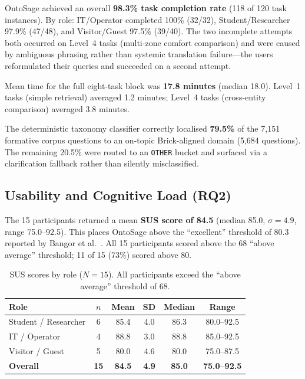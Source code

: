 \documentclass[acmsmall]{acmart}
\begin{document}
OntoSage achieved an overall \textbf{98.3\% task completion rate} (118 of 120 task instances). By role: IT/Operator completed 100\% (32/32), Student/Researcher 97.9\% (47/48), and Visitor/Guest 97.5\% (39/40). The two incomplete attempts both occurred on Level~4 tasks (multi-zone comfort comparison) and were caused by ambiguous phrasing rather than systemic translation failure---the users reformulated their queries and succeeded on a second attempt.

Mean time for the full eight-task block was \textbf{17.8 minutes} (median 18.0). Level~1 tasks (simple retrieval) averaged 1.2 minutes; Level~4 tasks (cross-entity comparison) averaged 3.8 minutes.

The deterministic taxonomy classifier correctly localised \textbf{79.5\%} of the 7{,}151 formative corpus questions to an on-topic Brick-aligned domain (5{,}684 questions). The remaining 20.5\% were routed to an \texttt{OTHER} bucket and surfaced via a clarification fallback rather than silently misclassified.

\subsection{Usability and Cognitive Load (RQ2)}
\label{sec:rq3-usability}

The 15 participants returned a mean \textbf{SUS score of 84.5} (median 85.0, $\sigma=4.9$, range 75.0--92.5). This places OntoSage above the ``excellent'' threshold of 80.3 reported by Bangor et al.\ \cite{Brooke1996}. All 15 participants scored above the 68 ``above average'' threshold; 11 of 15 (73\%) scored above 80.

\begin{table}[t]
\centering
\caption{SUS scores by role ($N=15$). All participants exceed the ``above average'' threshold of 68.}
\label{tab:sus-results}
\small
\begin{tabular}{@{}lccccc@{}}
\toprule
\textbf{Role} & \textbf{$n$} & \textbf{Mean} & \textbf{SD} & \textbf{Median} & \textbf{Range} \\
\midrule
Student / Researcher & 6  & 85.4 & 4.0 & 86.3 & 80.0--92.5 \\
IT / Operator        & 4  & 88.8 & 3.0 & 88.8 & 85.0--92.5 \\
Visitor / Guest      & 5  & 80.0 & 4.6 & 80.0 & 75.0--87.5 \\
\midrule
\textbf{Overall}     & \textbf{15} & \textbf{84.5} & \textbf{4.9} & \textbf{85.0} & \textbf{75.0--92.5} \\
\bottomrule
\end{tabular}
\end{table}
\end{document}
